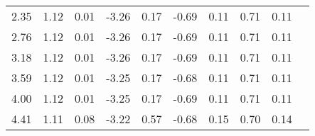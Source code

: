 \begin{tabular}{rrrrrrrrrr}
 2.35 &     1.12 &     0.01  &    -3.26 &      0.17 &     -0.69 &      0.11 &      0.71 &      0.11 \\ 
 2.76 &     1.12 &     0.01  &    -3.26 &      0.17 &     -0.69 &      0.11 &      0.71 &      0.11 \\ 
 3.18 &     1.12 &     0.01  &    -3.26 &      0.17 &     -0.69 &      0.11 &      0.71 &      0.11 \\ 
 3.59 &     1.12 &     0.01  &    -3.25 &      0.17 &     -0.68 &      0.11 &      0.71 &      0.11 \\ 
 4.00 &     1.12 &     0.01  &    -3.25 &      0.17 &     -0.69 &      0.11 &      0.71 &      0.11 \\ 
 4.41 &     1.11 &     0.08  &    -3.22 &      0.57 &     -0.68 &      0.15 &      0.70 &      0.14 \\ \hline 
\end{tabular}
